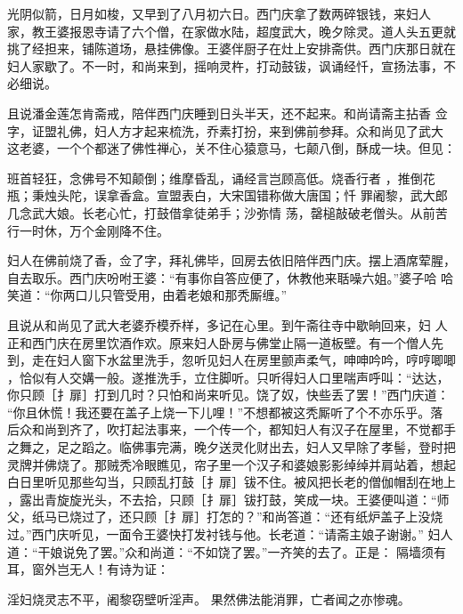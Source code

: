 光阴似箭，日月如梭，又早到了八月初六日。西门庆拿了数两碎银钱，来妇人
家，教王婆报恩寺请了六个僧，在家做水陆，超度武大，晚夕除灵。道人头五更就
挑了经担来，铺陈道场，悬挂佛像。王婆伴厨子在灶上安排斋供。西门庆那日就在
妇人家歇了。不一时，和尚来到，摇响灵杵，打动鼓钹，讽诵经忏，宣扬法事，不
必细说。

且说潘金莲怎肯斋戒，陪伴西门庆睡到日头半天，还不起来。和尚请斋主拈香
佥字，证盟礼佛，妇人方才起来梳洗，乔素打扮，来到佛前参拜。众和尚见了武大
这老婆，一个个都迷了佛性禅心，关不住心猿意马，七颠八倒，酥成一块。但见：

班首轻狂，念佛号不知颠倒；维摩昏乱，诵经言岂顾高低。烧香行者
，推倒花瓶；秉烛头陀，误拿香盒。宣盟表白，大宋国错称做大唐国；忏
罪阇黎，武大郎几念武大娘。长老心忙，打鼓借拿徒弟手；沙弥情
荡，罄槌敲破老僧头。从前苦行一时休，万个金刚降不住。

妇人在佛前烧了香，佥了字，拜礼佛毕，回房去依旧陪伴西门庆。摆上酒席荤腥，
自去取乐。西门庆吩咐王婆：“有事你自答应便了，休教他来聒噪六姐。”婆子哈
哈笑道：“你两口儿只管受用，由着老娘和那秃厮缠。”

且说从和尚见了武大老婆乔模乔样，多记在心里。到午斋往寺中歇晌回来，妇
人正和西门庆在房里饮酒作欢。原来妇人卧房与佛堂止隔一道板壁。有一个僧人先
到，走在妇人窗下水盆里洗手，忽听见妇人在房里颤声柔气，呻呻吟吟，哼哼唧唧
，恰似有人交媾一般。遂推洗手，立住脚听。只听得妇人口里喘声呼叫：“达达，
你只顾［扌扉］打到几时？只怕和尚来听见。饶了奴，快些丢了罢！”西门庆道：
“你且休慌！我还要在盖子上烧一下儿哩！”不想都被这秃厮听了个不亦乐乎。落
后众和尚到齐了，吹打起法事来，一个传一个，都知妇人有汉子在屋里，不觉都手
之舞之，足之蹈之。临佛事完满，晚夕送灵化财出去，妇人又早除了孝髻，登时把
灵牌并佛烧了。那贼秃冷眼瞧见，帘子里一个汉子和婆娘影影绰绰并肩站着，想起
白日里听见那些勾当，只顾乱打鼓［扌扉］钹不住。被风把长老的僧伽帽刮在地上
，露出青旋旋光头，不去拾，只顾［扌扉］钹打鼓，笑成一块。王婆便叫道：“师
父，纸马已烧过了，还只顾［扌扉］打怎的？”和尚答道：“还有纸炉盖子上没烧
过。”西门庆听见，一面令王婆快打发衬钱与他。长老道：“请斋主娘子谢谢。”
妇人道：“干娘说免了罢。”众和尚道：“不如饶了罢。”一齐笑的去了。正是：
隔墙须有耳，窗外岂无人！有诗为证：

淫妇烧灵志不平，阇黎窃壁听淫声。
果然佛法能消罪，亡者闻之亦惨魂。